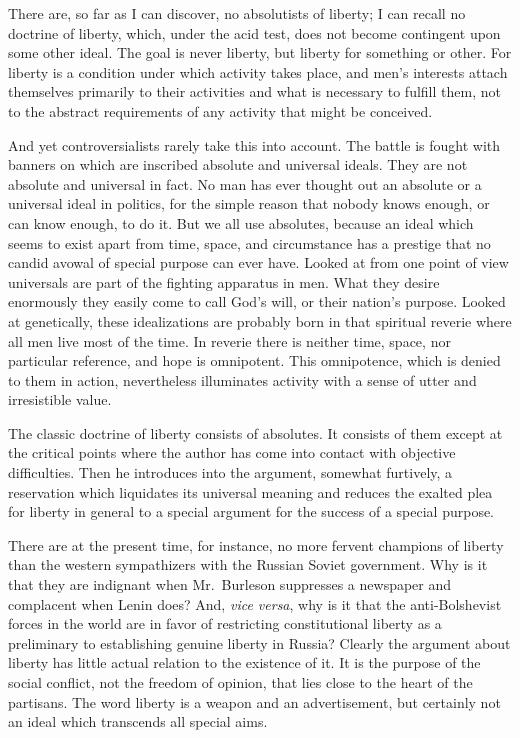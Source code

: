 \documentclass[openany,nobib,twoside,nohyper]{tufte-book}
\begin{document}
There are, so far as I can discover, no absolutists of liberty; I can
recall no doctrine of liberty, which, under the acid test, does not
become contingent upon some other ideal. The goal is never liberty, but
liberty for something or other. For liberty is a condition under which
activity takes place, and men's interests attach themselves primarily to
their activities and what is necessary to fulfill them, not to the
abstract requirements of any activity that might be conceived.

And yet controversialists rarely take this into account. The battle is
fought with banners on which are inscribed absolute and universal
ideals. They are not absolute and universal in fact. No man has ever
thought out an absolute or a universal ideal in politics, for the simple
reason that nobody knows enough, or can know enough, to do it. But we
all use absolutes, because an ideal which seems to exist apart from
time, space, and circumstance has a prestige that no candid avowal of
special purpose can ever have. Looked at from one point of view
universals are part of the fighting apparatus in men. What they desire
enormously they easily come to call God's will, or their nation's
purpose. Looked at genetically, these idealizations are probably born in
that spiritual reverie where all men live most of the time. In reverie
there is neither time, space, nor particular reference, and hope is
omnipotent. This omnipotence, which is denied to them in action,
nevertheless illuminates activity with a sense of utter and irresistible
value.

The classic doctrine of liberty consists of absolutes. It consists of
them except at the critical points where the author has come into
contact with objective difficulties. Then he introduces into the
argument, somewhat furtively, a reservation which liquidates its
universal meaning and reduces the exalted plea for liberty in general to
a special argument for the success of a special purpose.

There are at the present time, for instance, no more fervent champions
of liberty than the western sympathizers with the Russian Soviet
government. Why is it that they are indignant when Mr.~Burleson
suppresses a newspaper and complacent when Lenin does? And, \emph{vice
versa}, why is it that the anti-Bolshevist forces in the world are in
favor of restricting constitutional liberty as a preliminary to
establishing genuine liberty in Russia? Clearly the argument about
liberty has little actual relation to the existence of it. It is the
purpose of the social conflict, not the freedom of opinion, that lies
close to the heart of the partisans. The word liberty is a weapon and an
advertisement, but certainly not an ideal which transcends all special
aims.
\end{document}
